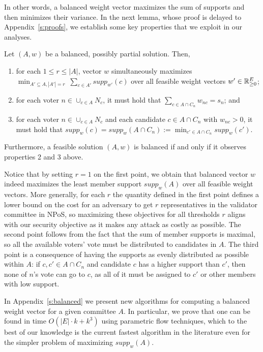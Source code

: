 In other words, a balanced weight vector maximizes the sum of supports and then minimizes their variance. 
In the next lemma, whose proof is delayed to Appendix~\ref{s:proofs}, we establish some key properties that we exploit in our analyses. 

\begin{lemma}\label{lem:balanced}
Let $(A,w)$ be a balanced, possibly partial solution. Then,
\begin{enumerate}
    \item for each $1\leq r\leq |A|$, vector $w$ simultaneously maximizes $\min_{A'\subseteq A, |A'|=r} \ \sum_{c\in A'} supp_{w'}(c)$ over all feasible weight vectors $w'\in\mathbb{R}_{\geq 0}^E$; 
		\item for each voter $n\in \cup_{c\in A} N_c$, it must hold that $\sum_{c\in A\cap C_n} w_{nc}=s_n$; and
    \item for each voter $n\in \cup_{c\in A} N_c$ and each candidate $c\in A\cap C_n$ with $w_{nc} > 0$, it must hold that $supp_w(c)=supp_w(A\cap C_n):=\min_{c'\in A\cap C_n} supp_w(c')$. 
\end{enumerate}
Furthermore, a feasible solution $(A,w)$ is balanced if and only if it observes properties 2 and 3 above.
\end{lemma}

Notice that by setting $r=1$ on the first point, we obtain that balanced vector $w$ indeed maximizes the least member support $supp_w(A)$ over all feasible weight vectors. 
More generally, for each $r$ the quantity defined in the first point defines a lower bound on the cost for an adversary to get $r$ representatives in the validator committee in NPoS, so maximizing these objectives for all thresholds $r$ aligns with our security objective as it makes any attack as costly as possible. 
The second point follows from the fact that the sum of member supports is maximal, so all the available voters' vote must be distributed to candidates in $A$. 
The third point is a consequence of having the supports as evenly distributed as possible within $A$: if $c,c'\in A\cap C_n$ and candidate $c$ has a higher support than $c'$, then none of $n$'s vote can go to $c$, as all of it must be assigned to $c'$ or other members with low support. 

In Appendix~\ref{s:balanced} we present new algorithms for computing a balanced weight vector for a given committee $A$. 
In particular, we prove that one can be found in time $O(|E|\cdot k + k^3)$ using parametric flow techniques, which to the best of our knowledge is the current fastest algorithm in the literature even for the simpler problem of maximizing $supp_w(A)$.

